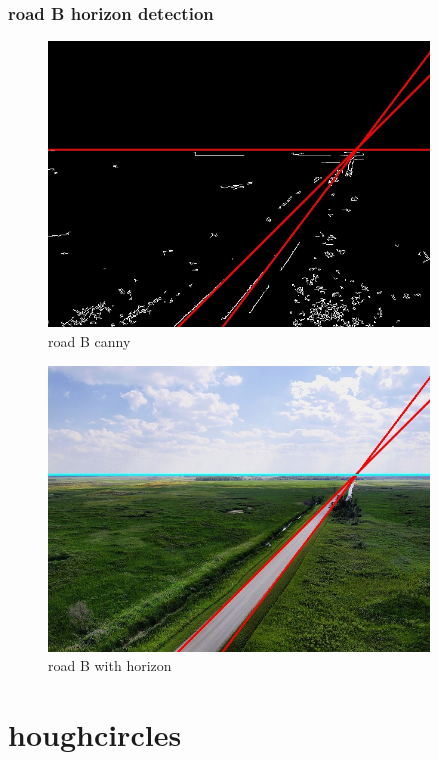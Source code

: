 \documentclass[11pt,a4paper]{article}
\begin{document}
\subsubsection{road B horizon detection}

\begin{figure}[H]
  \centering
  \includegraphics[width=0.9\textwidth]{road_B_canny}
  \caption{road B canny}
  \label{fig:canny_B}
\end{figure}

\begin{figure}[H]
  \centering
  \includegraphics[width=0.9\textwidth]{road_B_horizon}
  \caption{road B with horizon}
  \label{fig:B_horizon}
\end{figure}

\section{houghcircles}
\end{document}
